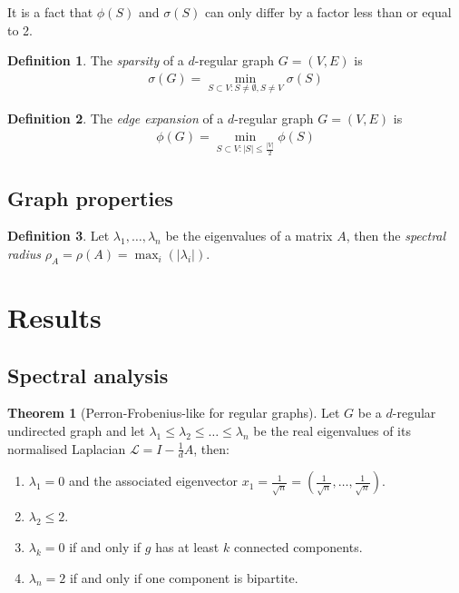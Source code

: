 \documentclass{article}
\theoremstyle{definition}
\newtheorem{definition}{Definition}[section]
\newtheorem{theorem}{Theorem}[section]
\begin{document}
It is a fact that $\phi(S)$ and $\sigma(S)$ can only differ by a factor less than or equal to 2.

\theoremstyle{definition}
\begin{definition}
  The \emph{sparsity} of a $d$-regular graph $G = (V, E)$ is
  \begin{align*}
    \sigma(G) = \min_{S \subset V: S \ne \emptyset, S \ne V} \sigma(S)
  \end{align*}
\end{definition}

\theoremstyle{definition}
\begin{definition}
  The \emph{edge expansion} of a $d$-regular graph $G = (V, E)$ is
  \begin{align*}
    \phi(G) = \min_{S \subset V: |S| \le \frac{|V|}{2}} \phi(S)
  \end{align*}
\end{definition}




\subsection{Graph properties}

\theoremstyle{definition}
\begin{definition}
  Let $\lambda_1, \dots, \lambda_n$ be the eigenvalues of a matrix $A$, then the \emph{spectral radius}
  $\rho_A = \rho(A) = \max_i(|\lambda_i|)$.
\end{definition}



\section{Results}

\subsection{Spectral analysis}

\begin{theorem}[Perron-Frobenius-like for regular graphs]
  Let $G$ be a $d$-regular undirected graph and let $\lambda_1 \le \lambda_2 \le \dots \le \lambda_n$ be the
  real eigenvalues of its normalised Laplacian $\mathcal{L} = I - \frac{1}{d}A$, then:
  \begin{enumerate}
    \item $\lambda_1 = 0$ and the associated eigenvector
      $x_1 = \frac{1}{\sqrt{n}} = (\frac{1}{\sqrt{n}}, \dots, \frac{1}{\sqrt{n}})$.
    \item $\lambda_2 \le 2$.
    \item $\lambda_k = 0$ if and only if $g$ has at least $k$ connected components.
    \item $\lambda_n = 2$ if and only if one component is bipartite.
  \end{enumerate}
\end{theorem}
\end{document}
